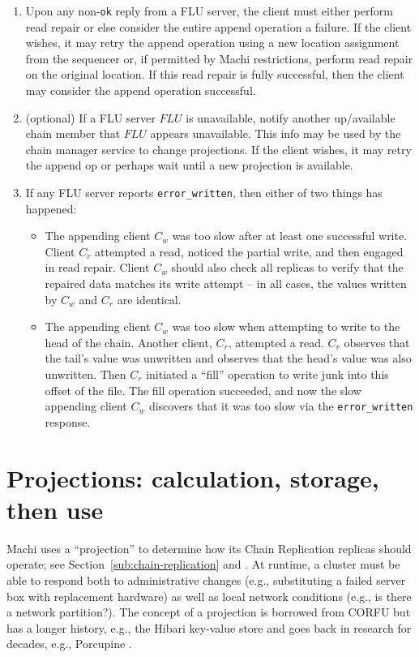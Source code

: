 \documentclass[preprint,10pt]{sigplanconf}
\begin{document}
\begin{enumerate}
\item Upon any non-{\tt ok} reply from a FLU server, the client must
either perform read repair or else consider the entire append
operation a failure.
If the client
wishes, it may retry the append operation using a new location
assignment from the sequencer or, if permitted by Machi restrictions,
perform read repair on the original location.  If this read repair is
fully successful, then the client may consider the append operation
successful.

\item (optional)
If a FLU server $FLU$ is unavailable, notify another up/available
chain member that $FLU$ appears unavailable.  This info may be used by
the chain manager service to change projections.  If the client
wishes, it may retry the append op or perhaps wait until a new projection is
available.

\item If any FLU server reports {\tt error\_written}, then either of two
things has happened:
\begin{itemize}
    \item The appending client $C_w$ was too slow after at least one
    successful write. 
    Client $C_r$ attempted a read, noticed the partial write, and
    then engaged in read repair.  Client $C_w$ should also check all
    replicas to verify that the repaired data matches its write
    attempt -- in all cases, the values written by $C_w$ and $C_r$ are
    identical.
    \item The appending client $C_w$ was too slow when attempting to write
    to the head of the chain.
    Another client, $C_r$, attempted a read.
    $C_r$ observes that the tail's value was
    unwritten and observes that the head's value was also unwritten.
    Then $C_r$ initiated a ``fill'' operation to write junk into
    this offset of
    the file.  The fill operation succeeded, and now the slow
    appending client $C_w$ discovers that it was too slow via the
    {\tt error\_written} response.
\end{itemize}

\end{enumerate}

\section{Projections: calculation, storage, then use}
\label{sec:projections}

Machi uses a ``projection'' to determine how its Chain Replication replicas
should operate; see Section~\ref{sub:chain-replication} and
\cite{corfu1}.  At runtime, a cluster must be able to respond both to
administrative changes (e.g., substituting a failed server box with
replacement hardware) as well as local network conditions (e.g., is
there a network partition?).  The concept of a projection is borrowed
from CORFU but has a longer history, e.g., the Hibari key-value store
\cite{cr-theory-and-practice} and goes back in research for decades,
e.g., Porcupine \cite{porcupine}.
\end{document}
